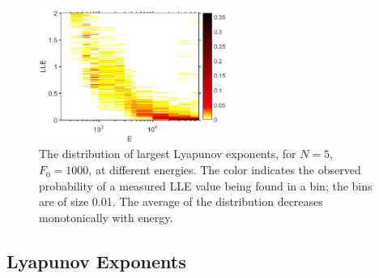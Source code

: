 \documentclass[a4paper, onecolumn]{revtex4-1}
\begin{document}




\begin{figure}[tb]
\centering
\includegraphics[width=0.55\textwidth]{LLEdistribution_1_11_pre_hot2_screenshot.png}
\caption{The distribution of largest Lyapunov exponents, for $N=5$, $F_0=1000$, at different
  energies.  The color indicates the observed probability of a measured LLE value being found in a
  bin; the bins are of size 0.01.  The average of the distribution decreases monotonically with
  energy.}  \label{fig:LLEdistribution1}
\end{figure}



\subsection{Lyapunov Exponents}
\end{document}
